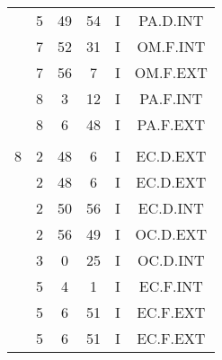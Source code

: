 \documentclass[12pt, a4paper]{article}
\begin{document}
\begin{multicols}{3}
{\begin{tabular}{c c c c c c}
	 	 	 	 & 5 & 49 & 54 & I & PA.D.INT\\%
	 	 	 	 & 7 & 52 & 31 & I & OM.F.INT\\%
	 	 	 	 & 7 & 56 & 7 & I & OM.F.EXT\\%
	 	 	 	 & 8 & 3 & 12 & I & PA.F.INT\\%
	 	 	 	 & 8 & 6 & 48 & I & PA.F.EXT\\%
	 	 	 	 & & & & & \\%
	 	 	 	8 & 2 & 48 & 6 & I & EC.D.EXT\\%
	 	 	 	 & 2 & 48 & 6 & I & EC.D.EXT\\%
	 	 	 	 & 2 & 50 & 56 & I & EC.D.INT\\%
	 	 	 	 & 2 & 56 & 49 & I & OC.D.EXT\\%
	 	 	 	 & 3 & 0 & 25 & I & OC.D.INT\\%
	 	 	 	 & 5 & 4 & 1 & I & EC.F.INT\\%
	 	 	 	 & 5 & 6 & 51 & I & EC.F.EXT\\%
	 	 	 	 & 5 & 6 & 51 & I & EC.F.EXT\\%
	 	 \end{tabular}
 	}
\end{multicols}
\end{document}
